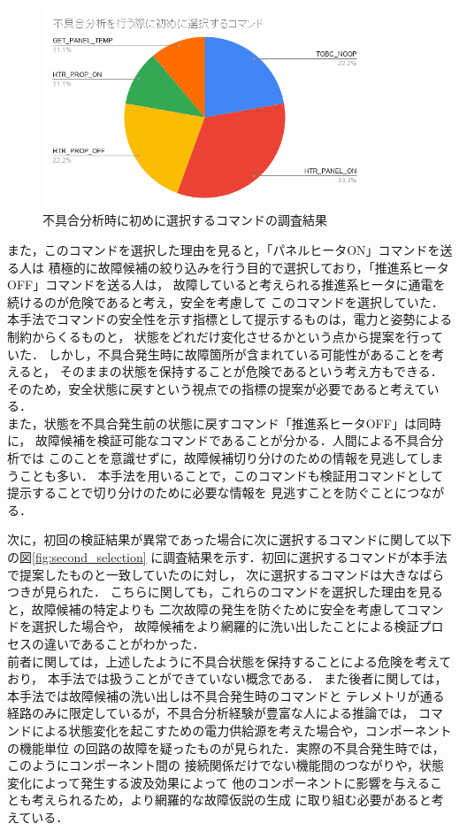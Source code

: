 \documentclass[11pt]{jsreport}
\begin{document}
\begin{figure}[H]
   \centering
      \includegraphics[height=6.0cm]{figure/first_selection.png}
      \caption{不具合分析時に初めに選択するコマンドの調査結果}
      \label{fig:first_selection}
\end{figure}
また，このコマンドを選択した理由を見ると，「パネルヒータON」コマンドを送る人は
積極的に故障候補の絞り込みを行う目的で選択しており，「推進系ヒータOFF」コマンドを送る人は，
故障していると考えられる推進系ヒータに通電を続けるのが危険であると考え，安全を考慮して
このコマンドを選択していた．
本手法でコマンドの安全性を示す指標として提示するものは，電力と姿勢による制約からくるものと，
状態をどれだけ変化させるかという点から提案を行っていた．
しかし，不具合発生時に故障箇所が含まれている可能性があることを考えると，
そのままの状態を保持することが危険であるという考え方もできる．
そのため，安全状態に戻すという視点での指標の提案が必要であると考えている．\\
また，状態を不具合発生前の状態に戻すコマンド「推進系ヒータOFF」は同時に，
故障候補を検証可能なコマンドであることが分かる．人間による不具合分析では
このことを意識せずに，故障候補切り分けのための情報を見逃してしまうことも多い．
本手法を用いることで，このコマンドも検証用コマンドとして提示することで切り分けのために必要な情報を
見逃すことを防ぐことにつながる．

次に，初回の検証結果が異常であった場合に次に選択するコマンドに関して以下の図\ref{fig:second_selection}
に調査結果を示す．初回に選択するコマンドが本手法で提案したものと一致していたのに対し，
次に選択するコマンドは大きなばらつきが見られた．
こちらに関しても，これらのコマンドを選択した理由を見ると，故障候補の特定よりも
二次故障の発生を防ぐために安全を考慮してコマンドを選択した場合や，
故障候補をより網羅的に洗い出したことによる検証プロセスの違いであることがわかった．\\
前者に関しては，上述したように不具合状態を保持することによる危険を考えており，
本手法では扱うことができていない概念である．
また後者に関しては，本手法では故障候補の洗い出しは不具合発生時のコマンドと
テレメトリが通る経路のみに限定しているが，不具合分析経験が豊富な人による推論では，
コマンドによる状態変化を起こすための電力供給源を考えた場合や，コンポーネントの機能単位
の回路の故障を疑ったものが見られた．実際の不具合発生時では，このようにコンポーネント間の
接続関係だけでない機能間のつながりや，状態変化によって発生する波及効果によって
他のコンポーネントに影響を与えることも考えられるため，より網羅的な故障仮説の生成
に取り組む必要があると考えている．\\%
\end{document}
